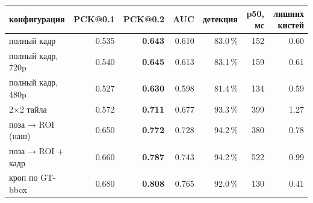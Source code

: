 \begin{tabular}{lrrrrrr}
\toprule
конфигурация & PCK@0.1 & PCK@0.2 & AUC & детекция & p50, мс & лишних кистей \\
\midrule
полный кадр & 0.535 & \textbf{0.643} & 0.610 & 83.0\,\% & 152 & 0.60 \\
полный кадр, 720p & 0.540 & \textbf{0.645} & 0.613 & 83.1\,\% & 159 & 0.61 \\
полный кадр, 480p & 0.527 & \textbf{0.630} & 0.598 & 81.4\,\% & 134 & 0.59 \\
2×2 тайла & 0.572 & \textbf{0.711} & 0.677 & 93.3\,\% & 399 & 1.27 \\
поза → ROI (наш) & 0.650 & \textbf{0.772} & 0.728 & 94.2\,\% & 380 & 0.78 \\
поза → ROI + кадр & 0.660 & \textbf{0.787} & 0.743 & 94.2\,\% & 522 & 0.99 \\
кроп по GT-bbox & 0.680 & \textbf{0.808} & 0.765 & 92.0\,\% & 130 & 0.41 \\
\bottomrule
\end{tabular}
